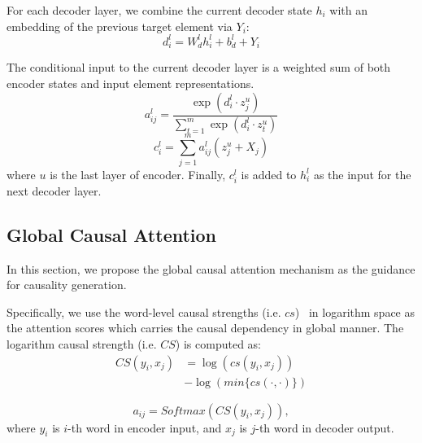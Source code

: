 For each decoder layer, 
we combine the current decoder state $h_{i}$
with an embedding of the previous target element via $Y_{i}$:
\begin{equation}
d _ { i } ^ { l } = W _ { d } ^ { l } h _ { i } ^ { l } + b _ { d } ^ { l } + Y _ { i }
\end{equation}

The conditional input to the current 
decoder layer is a weighted sum of both encoder states and input element representations.
\begin{equation}\label{eq:a}
a _ { i j } ^ { l } = \frac { \exp \left( d _ { i } ^ { l } \cdot z _ { j } ^ { u } \right) } { \sum _ { t = 1 } ^ { m } \exp \left( d _ { i } ^ { l } \cdot z _ { t } ^ { u } \right) }
\end{equation}
\begin{equation}\label{eq:c}
c _ { i } ^ { l } = \sum _ { j = 1 } ^ { m } a _ { i j } ^ { l } \left( z _ { j } ^ { u } + X_j \right)
\end{equation}
where $u$ is the last layer of encoder.  
Finally, $c _ { i } ^ { l }$ is added to $h_{i}^{l}$ as the input for the next decoder layer.


\subsection{Global Causal Attention}
In this section, we propose the global causal attention mechanism as the guidance for causality generation.

Specifically, we use the word-level causal strengths (i.e. $cs$)~\cite{} in logarithm space as the attention scores which carries the causal dependency in global manner.
The logarithm causal strength (i.e. $CS$) is computed as:
\begin{equation}\label{eq:acs}
	\begin{split}
	CS(y_i, x_j)  & =  \log\left(cs(y_i,x_j)\right) \\
		& - \log\left(min\{cs(\cdot, \cdot)\}\right)
	\end{split}
\end{equation}

\begin{equation}
\label{eq:causal_attn}
a _ { i j }= Softmax\left( CS(y_i, x_j) \right) ,
\end{equation}
where $y_i$ is $i$-th word in encoder input, 
and $x_j$ is $j$-th word in decoder output.

